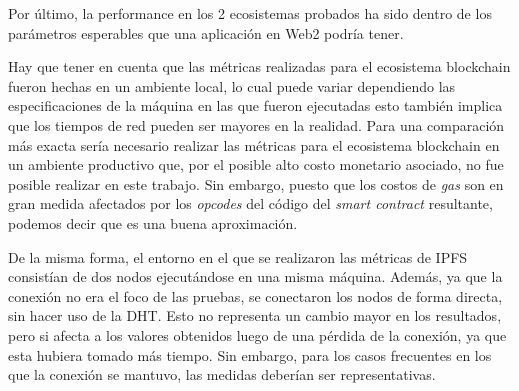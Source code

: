 Por último, la performance en los 2 ecosistemas probados ha sido dentro de los parámetros esperables que una aplicación en Web2 podría tener.

Hay que tener en cuenta que las métricas realizadas para el ecosistema blockchain fueron hechas en un ambiente local, lo cual puede variar dependiendo las especificaciones de la máquina en las que fueron ejecutadas esto también implica que los tiempos de red pueden ser mayores en la realidad. Para una comparación más exacta sería necesario realizar las métricas para el ecosistema blockchain en un ambiente productivo que, por el posible alto costo monetario asociado, no fue posible realizar en este trabajo. Sin embargo, puesto que los costos de \textit{gas} son en gran medida afectados por los \textit{opcodes} del código del \textit{smart contract} resultante, podemos decir que es una buena aproximación.

De la misma forma, el entorno en el que se realizaron las métricas de IPFS consistían de dos nodos ejecutándose en una misma máquina. Además, ya que la conexión no era el foco de las pruebas, se conectaron los nodos de forma directa, sin hacer uso de la DHT. Esto no representa un cambio mayor en los resultados, pero si afecta a los valores obtenidos luego de una pérdida de la conexión, ya que esta hubiera tomado más tiempo. Sin embargo, para los casos frecuentes en los que la conexión se mantuvo, las medidas deberían ser representativas.